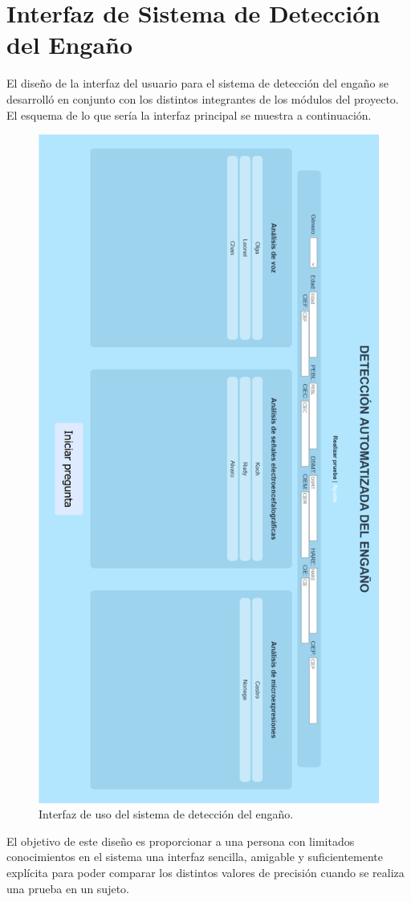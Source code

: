 \section{Interfaz de Sistema de Detección del Engaño}
El diseño de la interfaz del usuario para el sistema de detección del engaño se desarrolló en conjunto con los distintos integrantes de los módulos del proyecto. El esquema de lo que sería la interfaz principal se muestra a continuación.
\begin{figure}
    \centering
    \includegraphics[scale=0.42]{figuras/Imagen20.PNG}
    \caption{Interfaz de uso del sistema de detección del engaño.}
    \label{fig:my_label}
\end{figure}
El objetivo de este diseño es proporcionar a una persona con limitados conocimientos en el sistema una interfaz sencilla, amigable y suficientemente explícita para poder comparar los distintos valores de precisión cuando se realiza una prueba en un sujeto. 

